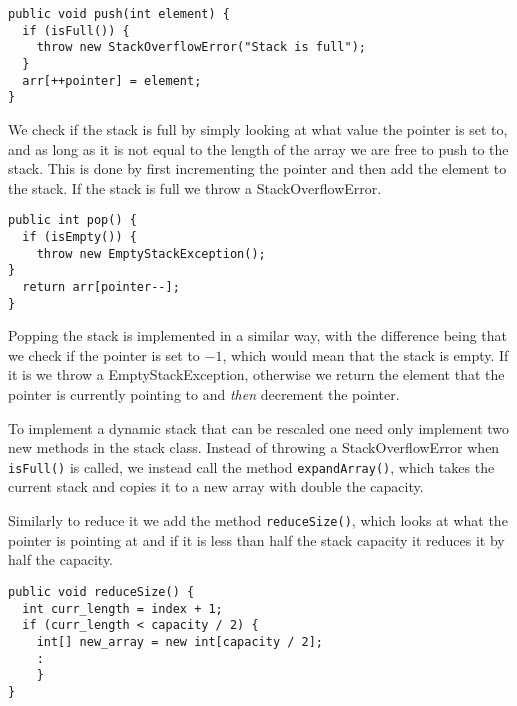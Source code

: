 \documentclass[a4paper,11pt]{article}
\begin{document}
\begin{verbatim}
public void push(int element) {
  if (isFull()) {
    throw new StackOverflowError("Stack is full");
  }
  arr[++pointer] = element;
}
\end{verbatim}
We check if the stack is full by simply looking at what value the pointer is set to, and as
long as it is not equal to the length of the array we are free to push to the stack. This is
done by first incrementing the pointer and then add the element to the stack. If the stack is
full we throw a StackOverflowError.

\begin{verbatim}
public int pop() {
  if (isEmpty()) {
    throw new EmptyStackException();
}
  return arr[pointer--];
}
\end{verbatim}
Popping the stack is implemented in a similar way, with the difference being that we check
if the pointer is set to $-1$, which would mean that the stack is empty. If it is we throw a
EmptyStackException, otherwise we return the element that the pointer is currently pointing
to and \textit{then} decrement the pointer.

To implement a dynamic stack that can be rescaled one need only implement two new methods
in the stack class. Instead of throwing a StackOverflowError when {\tt isFull()} is called,
we instead call the method {\tt expandArray()}, which takes the current stack and copies it
to a new array with double the capacity.

Similarly to reduce it we add the method {\tt reduceSize()}, which looks at what the pointer
is pointing at and if it is less than half the stack capacity it reduces it by half the capacity.

\begin{verbatim}
public void reduceSize() {
  int curr_length = index + 1;
  if (curr_length < capacity / 2) {
    int[] new_array = new int[capacity / 2];
    :        
    }
}
\end{verbatim}
\end{document}
